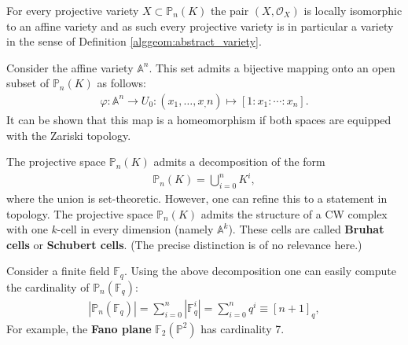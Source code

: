     \begin{property}[Variety]
        For every projective variety $X\subset\mathbb{P}_n(K)$ the pair $(X, \mathcal{O}_X)$ is locally isomorphic to an affine variety and as such every projective variety is in particular a variety in the sense of Definition \ref{alggeom:abstract_variety}.
    \end{property}
    \begin{property}
        Consider the affine variety $\mathbb{A}^n$. This set admits a bijective mapping onto an open subset of $\mathbb{P}_n(K)$ as follows:
        \begin{gather}
            \varphi:\mathbb{A}^n\rightarrow U_0:(x_1,\ldots,x_,n)\mapsto[1:x_1:\cdots:x_n].
        \end{gather}
        It can be shown that this map is a homeomorphism if both spaces are equipped with the Zariski topology.
    \end{property}

    \begin{property}
        The projective space $\mathbb{P}_n(K)$ admits a decomposition of the form
        \begin{gather}
            \mathbb{P}_n(K) = \bigcup_{i=0}^nK^i,
        \end{gather}
        where the union is set-theoretic. However, one can refine this to a statement in topology. The projective space $\mathbb{P}_n(K)$ admits the structure of a CW complex with one $k$-cell in every dimension (namely $\mathbb{A}^k$). These cells are called \textbf{Bruhat cells} or \textbf{Schubert cells}. (The precise distinction is of no relevance here.)
    \end{property}

    \begin{example}
        Consider a finite field $\mathbb{F}_q$. Using the above decomposition one can easily compute the cardinality of $\mathbb{P}_n(\mathbb{F}_q)$:
        \begin{gather}
            |\mathbb{P}_n(\mathbb{F}_q)| = \sum_{i=0}^n|\mathbb{F}_q^i| = \sum_{i=0}^nq^i \equiv [n+1]_q,
        \end{gather}
        For example, the \textbf{Fano plane} $\mathbb{F}_2(\mathbb{P}^2)$ has cardinality 7.
    \end{example}

